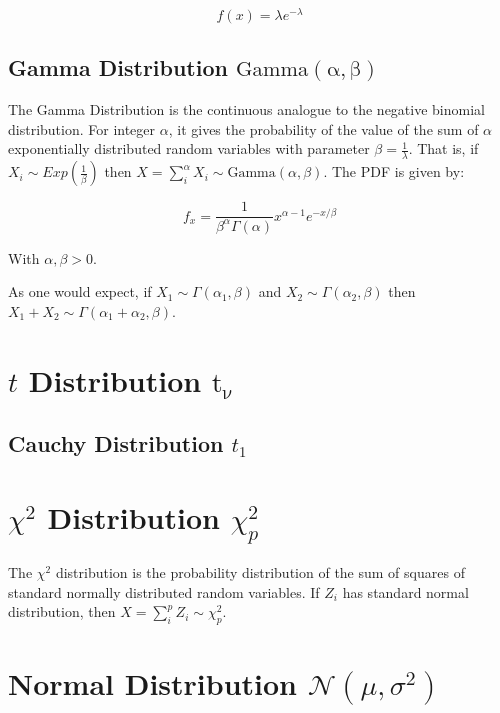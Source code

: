 \begin{equation}
f(x) = \lambda e^{-\lambda}
\end{equation}


\subsection{Gamma Distribution $\mathrm{Gamma(\alpha,\beta)}$}
The Gamma Distribution is the continuous analogue to the negative binomial distribution. For integer $\alpha$, it gives the probability of the value of the sum of $\alpha$ exponentially distributed random variables with parameter $\beta=\frac{1}{\lambda}$. That is, if $X_i \sim Exp(\frac{1}{\beta})$ then $X = \sum_i^\alpha X_i \sim \mathrm{Gamma}(\alpha,\beta)$. The PDF is given by:

\begin{equation}
f_x = \frac{1}{\beta^\alpha \Gamma(\alpha)}x^{\alpha-1}e^{-x/\beta}
\end{equation}

With $\alpha,\beta > 0$.

As one would expect, if $X_1 \sim \Gamma(\alpha_1,\beta)$ and $X_2 \sim \Gamma(\alpha_2,\beta)$ then $X_1 + X_2 \sim \Gamma(\alpha_1+\alpha_2,\beta)$. 



\section{$t$ Distribution $\mathrm{t_\nu\ }$}

\subsection{Cauchy Distribution $t_1$}



\section{$\chi^2$ Distribution $\chi^2_p$}
The $\chi^2$ distribution is the probability distribution of the sum of squares of standard normally distributed random variables. If $Z_i$ has standard normal distribution, then $X = \sum_i^p Z_i \sim \chi^2_p$.



\section{Normal Distribution $\mathscr{N}(\mu,\sigma^2)$}


